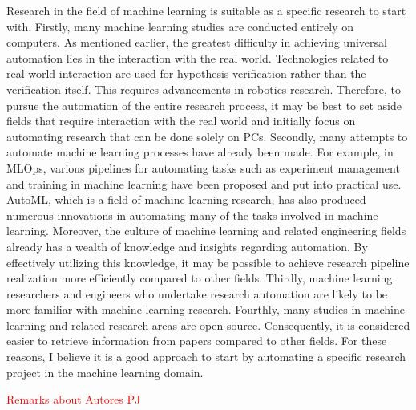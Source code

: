 \documentclass{book}
\begin{document}
Research in the field of machine learning is suitable as a specific research to start with. Firstly, many machine learning studies are conducted entirely on computers. As mentioned earlier, the greatest difficulty in achieving universal automation lies in the interaction with the real world. Technologies related to real-world interaction are used for hypothesis verification rather than the verification itself. This requires advancements in robotics research. Therefore, to pursue the automation of the entire research process, it may be best to set aside fields that require interaction with the real world and initially focus on automating research that can be done solely on PCs. Secondly, many attempts to automate machine learning processes have already been made. For example, in MLOps, various pipelines for automating tasks such as experiment management and training in machine learning have been proposed and put into practical use. AutoML, which is a field of machine learning research, has also produced numerous innovations in automating many of the tasks involved in machine learning. Moreover, the culture of machine learning and related engineering fields already has a wealth of knowledge and insights regarding automation. By effectively utilizing this knowledge, it may be possible to achieve research pipeline realization more efficiently compared to other fields. Thirdly, machine learning researchers and engineers who undertake research automation are likely to be more familiar with machine learning research. Fourthly, many studies in machine learning and related research areas are open-source. Consequently, it is considered easier to retrieve information from papers compared to other fields. For these reasons, I believe it is a good approach to start by automating a specific research project in the machine learning domain.

\textcolor{red}{Remarks about Autores PJ}


\end{document}
